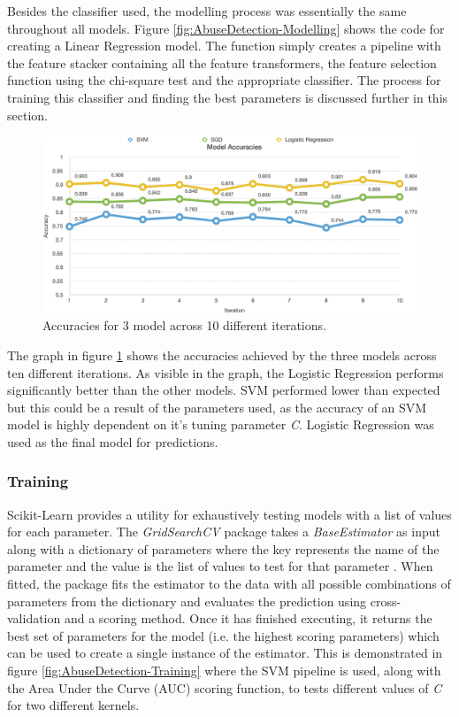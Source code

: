 Besides the classifier used, the modelling process was essentially the same throughout all models. Figure \ref{fig:AbuseDetection-Modelling} shows the code for creating a Linear Regression model. The function simply creates a pipeline with the feature stacker containing all the feature transformers, the feature selection function using the chi-square test and the appropriate classifier. The process for training this classifier and finding the best parameters is discussed further in this section.

\begin{figure}[H]
    \centering
    \includegraphics[width=\textwidth]{Images/Implementation/DataProcessing/AbuseDetection/ModelAccuracies}
    \caption{Accuracies for 3 model across 10 different iterations.}
    \label{fig:AbuseDetection-ModelAccuracies}
\end{figure}

The graph in figure \ref{fig:AbuseDetection-ModelAccuracies} shows the accuracies achieved by the three models across ten different iterations. As visible in the graph, the Logistic Regression performs significantly better than the other models. SVM performed lower than expected but this could be a result of the parameters used, as the accuracy of an SVM model is highly dependent on it's tuning parameter \textit{C}. Logistic Regression was used as the final model for predictions.

\subsubsection{Training}
Scikit-Learn provides a utility for exhaustively testing models with a list of values for each parameter. The \textit{GridSearchCV} package takes a \textit{BaseEstimator} as input along with a dictionary of parameters where the key represents the name of the parameter and the value is the list of values to test for that parameter \cite{Scikit:GridSearch}. When fitted, the package fits the estimator to the data with all possible combinations of parameters from the dictionary and evaluates the prediction using cross-validation and a scoring method. Once it has finished executing, it returns the best set of parameters for the model (i.e. the highest scoring parameters) which can be used to create a single instance of the estimator. This is demonstrated in figure \ref{fig:AbuseDetection-Training} where the SVM pipeline is used, along with the Area Under the Curve (AUC) scoring function, to tests different values of \textit{C} for two different kernels.

